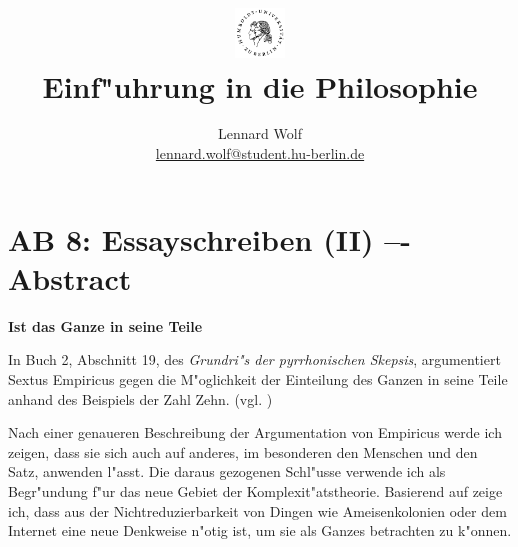 \documentclass[a4paper]{article}
\date{\vspace{-3ex}}
\begin{document}
\title{
    \vspace{-30pt}
	\includegraphics*[width=0.1\textwidth,left]{images/hu_logo2.png}\\
	\vspace{-10pt}
	Einf"uhrung in die Philosophie}
\author{Lennard Wolf\\
        \small{\href{mailto:lennard.wolf@student.hu-berlin.de}{lennard.wolf@student.hu-berlin.de}}}
\maketitle
\vspace{0pt}

\section*{AB 8: Essayschreiben (II) –- Abstract}
\large

\noindent\textbf{Ist das Ganze in seine Teile }

\noindent In Buch 2, Abschnitt 19, des \emph{Grundri"s der pyrrhonischen Skepsis}, argumentiert Sextus Empiricus gegen die M"oglichkeit der Einteilung des Ganzen in seine Teile anhand des Beispiels der Zahl Zehn. (vgl. \cite[S. 209f.]{empiricus2013grundriss}) 

Nach einer genaueren Beschreibung der Argumentation von Empiricus werde ich zeigen, dass sie sich auch auf anderes, im besonderen den Menschen und den Satz, anwenden l"asst. Die daraus gezogenen Schl"usse verwende ich als Begr"undung f"ur das neue Gebiet der Komplexit"atstheorie. Basierend auf \cite{mitchell2009complexity} zeige ich, dass aus der Nichtreduzierbarkeit von Dingen wie Ameisenkolonien oder dem Internet eine neue Denkweise n"otig ist, um sie als Ganzes betrachten zu k"onnen. 



\end{document}
